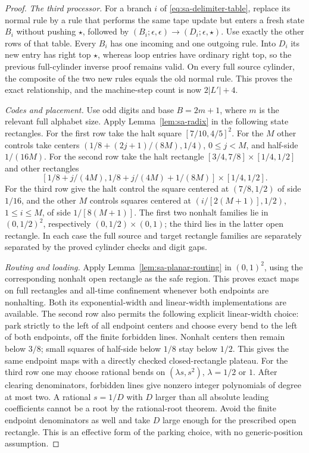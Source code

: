 \begin{proof}
\emph{The third processor.}  For a branch $i$ of
\eqref{eq:sa-delimiter-table}, replace its normal rule by a rule that
performs the same tape update but enters a fresh state $B_i$ without
pushing $\star$, followed by
$(B_i;\epsilon,\epsilon)\to(D_i;\epsilon,\star)$.
Use exactly the other rows of that table.  Every $B_i$ has one incoming
and one outgoing rule.  Into $D_i$ its new entry has right top $\star$,
whereas loop entries have ordinary right top, so the previous full-cylinder
inverse proof remains valid.  On every full source cylinder, the composite
of the two new rules equals the old normal rule.  This proves the exact
relationship, and the machine-step count is now $2|L'|+4$.


\emph{Codes and placement.}  Use odd digits and base $B=2m+1$, where
$m$ is the relevant full alphabet size.  Apply Lemma~\ref{lem:sa-radix}
in the following state rectangles.
For the first row take the halt square $[7/10,4/5]^2$.  For the $M$
other controls take centers $(1/8+(2j+1)/(8M),1/4)$,
$0\le j<M$, and half-side $1/(16M)$.
For the second row take the halt rectangle
$[3/4,7/8]\times[1/4,1/2]$ and other rectangles
\[
 [1/8+j/(4M),1/8+j/(4M)+1/(8M)]\times[1/4,1/2].
\]
For the third row give the halt control the square centered at
$(7/8,1/2)$ of side $1/16$, and the other $M$ controls squares centered
at $(i/[2(M+1)],1/2)$, $1\le i\le M$, of side $1/[8(M+1)]$.
The first two nonhalt families lie in $(0,1/2)^2$, respectively
$(0,1/2)\times(0,1)$; the third lies in the latter open rectangle.
In each case the full source and target rectangle families are separately
separated by the proved cylinder checks and digit gaps.

\emph{Routing and loading.}  Apply Lemma~\ref{lem:sa-planar-routing}
in $(0,1)^2$, using the corresponding nonhalt open rectangle as the safe
region.  This proves exact maps on full rectangles and all-time confinement
whenever both endpoints are nonhalting.  Both its exponential-width and
linear-width implementations are available.  The second row also permits
the following explicit linear-width choice: park strictly to the left of
all endpoint centers and choose every bend to the left of both endpoints,
off the finite forbidden lines.  Nonhalt centers then remain below $3/8$;
small squares of half-side below $1/8$ stay below $1/2$.  This gives the
same endpoint maps with a directly checked closed-rectangle plateau.
For the third row one may choose rational bends on $(\lambda s,s^2)$,
$\lambda=1/2$ or $1$.  After clearing denominators, forbidden lines give
nonzero integer polynomials of degree at most two.  A rational $s=1/D$
with $D$ larger than all absolute leading coefficients cannot be a root
by the rational-root theorem.  Avoid the finite endpoint denominators
as well and take $D$ large enough for the prescribed open rectangle.
This is an effective form of the parking choice, with no generic-position
assumption.


\end{proof}
